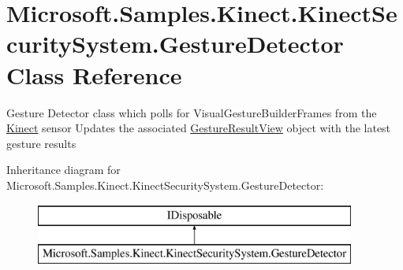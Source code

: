 \hypertarget{class_microsoft_1_1_samples_1_1_kinect_1_1_kinect_security_system_1_1_gesture_detector}{}\section{Microsoft.\+Samples.\+Kinect.\+Kinect\+Security\+System.\+Gesture\+Detector Class Reference}
\label{class_microsoft_1_1_samples_1_1_kinect_1_1_kinect_security_system_1_1_gesture_detector}


Gesture Detector class which polls for Visual\+Gesture\+Builder\+Frames from the \hyperlink{namespace_microsoft_1_1_samples_1_1_kinect}{Kinect} sensor Updates the associated \hyperlink{class_microsoft_1_1_samples_1_1_kinect_1_1_kinect_security_system_1_1_gesture_result_view}{Gesture\+Result\+View} object with the latest gesture results  


Inheritance diagram for Microsoft.\+Samples.\+Kinect.\+Kinect\+Security\+System.\+Gesture\+Detector\+:\begin{figure}[H]
\begin{center}
\leavevmode
\includegraphics[height=2.000000cm]{class_microsoft_1_1_samples_1_1_kinect_1_1_kinect_security_system_1_1_gesture_detector}
\end{center}
\end{figure}
